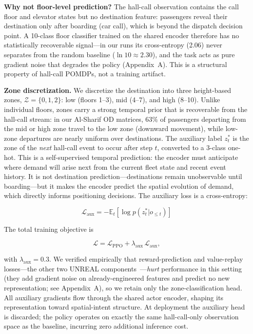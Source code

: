 \documentclass{IEEEcsmag}
\begin{document}
\textbf{Why not floor-level prediction?} The hall-call observation
contains the call floor and elevator states but no destination
feature: passengers reveal their destination only after boarding
(car call), which is beyond the dispatch decision point. A 10-class
floor classifier trained on the shared encoder therefore has no
statistically recoverable signal---in our runs its cross-entropy
(2.06) never separates from the random baseline ($\ln 10 \approx
2.30$), and the task acts as pure gradient noise that degrades the
policy (Appendix~A). This is a structural property of hall-call
POMDPs, not a training artifact.

\textbf{Zone discretization.} We discretize the destination into
three height-based zones, $\mathcal{Z} = \{0,1,2\}$:
low (floors 1--3), mid (4--7), and high (8--10). Unlike individual
floors, zones carry a strong temporal prior that is recoverable from
the hall-call stream: in our Al-Sharif OD matrices, 63\% of
passengers departing from the mid or high zone travel to the low
zone (downward movement), while low-zone departures are nearly
uniform over destinations. The auxiliary label $z_t^*$ is the zone of the \emph{next}
hall-call event to occur after step $t$, converted to a 3-class
one-hot. This is a self-supervised temporal prediction: the encoder
must anticipate where demand will arise next from the current
fleet state and recent event history. It is not destination
prediction---destinations remain unobservable until boarding---but
it makes the encoder predict the spatial evolution of demand, which
directly informs positioning decisions. The auxiliary loss is a cross-entropy:

\begin{equation}
\mathcal{L}_{\text{aux}} = -\mathbb{E}_t\left[
\log p(z_t^* | o_{\le t})\right]
\end{equation}

The total training objective is

\begin{equation}
\mathcal{L} = \mathcal{L}_{\text{PPO}} + \lambda_{\text{aux}}\,
\mathcal{L}_{\text{aux}},
\label{eq:total_loss}
\end{equation}

with $\lambda_{\text{aux}} = 0.3$. We verified empirically that
reward-prediction and value-replay losses---the other two UNREAL
components~\cite{jaderberg2017unreal}---\emph{hurt} performance in
this setting (they add gradient noise on already-engineered features
and predict no new representation; see Appendix~A), so we retain only
the zone-classification head. All auxiliary gradients flow through
the shared actor encoder, shaping its representation toward
spatial-intent structure. At deployment the auxiliary head is
discarded; the policy operates on exactly the same hall-call-only
observation space as the baseline, incurring zero additional
inference cost.
\end{document}
